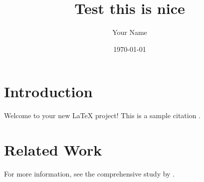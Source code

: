 \documentclass{article}
\title{Test this is nice }
\author{Your Name}
\date{\today}
\begin{document}
\maketitle

\section{Introduction}
Welcome to your new LaTeX project! This is a sample citation \cite{example2023}.

\section{Related Work}
For more information, see the comprehensive study by \cite{sample2024}.



\end{document}
